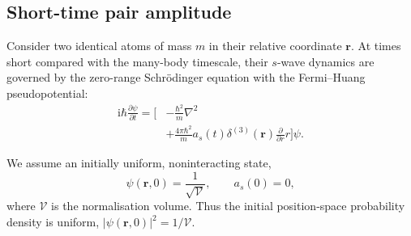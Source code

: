 \documentclass[9pt,a4paper,twocolumn,twoside]{rho-class/rho}
\newif\ifreportdraft
\newcommand{\draftnote}[1]{%
    \ifreportdraft
        \par\smallskip
        \noindent\textbf{\textsf{[TO COMPLETE]}} \textit{#1}
        \par\smallskip
    \fi
}
\newcommand{\ii}{\mathrm{i}}
\begin{document}
        \draftnote{State the regime in which the zero-range and short-time approximations are valid for the chosen gas. Define all density, range, and many-body timescale inequalities that will later be checked.}

    \subsection{Short-time pair amplitude}

        Consider two identical atoms of mass $m$ in their relative coordinate $\mathbf r$. At times short compared with the many-body timescale, their $s$-wave dynamics are governed by the zero-range Schrödinger equation with the Fermi--Huang pseudopotential:
        \begin{equation}\label{eq:time-dependent-pseudopotential}
            \begin{aligned}
                \ii\hbar\frac{\partial\psi}{\partial t}
                =\Bigg[&-\frac{\hbar^2}{m}\nabla^2\\
                &+\frac{4\pi\hbar^2}{m}a_s(t)\delta^{(3)}(\mathbf r)
                \frac{\partial}{\partial r}r\Bigg]\psi.
            \end{aligned}
        \end{equation}

        We assume an initially uniform, noninteracting state,
        \begin{equation}\label{eq:noninteracting-initial-state}
            \psi(\mathbf r,0)=\frac{1}{\sqrt{\mathcal V}},
            \qquad a_s(0)=0,
        \end{equation}
        where $\mathcal V$ is the normalisation volume. Thus the initial position-space probability density is uniform, $\lvert\psi(\mathbf r,0)\rvert^2=1/\mathcal V$.
\end{document}
